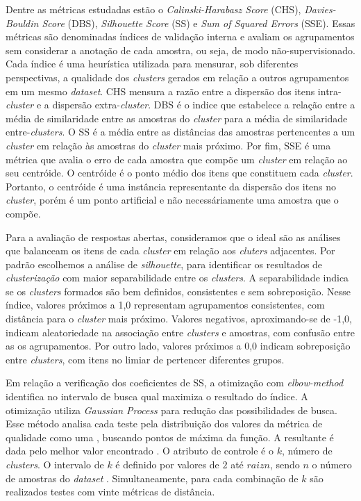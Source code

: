 Dentre as métricas estudadas estão o \textit{Calinski-Harabasz Score} (CHS), \textit{Davies-Bouldin Score} (DBS), \textit{Silhouette Score} (SS) e \textit{Sum of Squared Errors} (SSE). Essas métricas são denominadas índices de validação interna e avaliam os agrupamentos sem considerar a anotação de cada amostra, ou seja, de modo não-supervisionado. Cada índice é uma heurística utilizada para mensurar, sob diferentes perspectivas, a qualidade dos \textit{clusters} gerados em relação a outros agrupamentos em um mesmo \textit{dataset}. CHS mensura a razão entre a dispersão dos itens intra-\textit{cluster} e a dispersão extra-\textit{cluster}. DBS é o indice que estabelece a relação entre a média de similaridade entre as amostras do \textit{cluster} para a média de similaridade entre-\textit{clusters}. O SS é a média entre as distâncias das amostras pertencentes a um \textit{cluster} em relação às amostras do \textit{cluster} mais próximo. Por fim, SSE é uma métrica que avalia o erro de cada amostra que compõe um \textit{cluster} em relação ao seu centróide. O centróide é o ponto médio dos itens que constituem cada \textit{cluster}. Portanto, o centróide é uma instância representante da dispersão dos itens no \textit{cluster}, porém é um ponto artificial e não necessáriamente uma amostra que o compõe.

Para a avaliação de respostas abertas, consideramos que o ideal são as análises que balanceam os itens de cada \textit{cluster} em relação aos \textit{cluters} adjacentes. Por padrão escolhemos a análise de \textit{silhouette}, para identificar os resultados de \textit{clusterização} com maior separabilidade entre os \textit{clusters}. A separabilidade indica se os \textit{clusters} formados são bem definidos, consistentes e sem sobreposição. Nesse índice, valores próximos a 1,0 representam agrupamentos consistentes, com distância para o \textit{cluster} mais próximo. Valores negativos, aproximando-se de -1,0, indicam aleatoriedade na associação entre \textit{clusters} e amostras, com confusão entre as os agrupamentos. Por outro lado, valores próximos a 0,0 indicam sobreposição entre \textit{clusters}, com itens no limiar de pertencer diferentes grupos. 

Em relação a verificação dos coeficientes de SS, a otimização com \textit{elbow-method} identifica no intervalo de busca qual maximiza o resultado do índice. A otimização utiliza \textit{Gaussian Process} para redução das possibilidades de busca. Esse método analisa cada teste pela distribuição dos valores da métrica de qualidade como uma , buscando pontos de máxima da função. A resultante é dada pelo melhor valor encontrado \cite{spalenza2019-isda}. O atributo de controle é o $ k $, número de \textit{clusters}. O intervalo de $ k $ é definido por valores de $ 2 $ até $ raiz n $, sendo $ n $ o número de amostras do \textit{dataset} \cite{jin2011}. Simultaneamente, para cada combinação de $ k $ são realizados testes com vinte métricas de distância.

